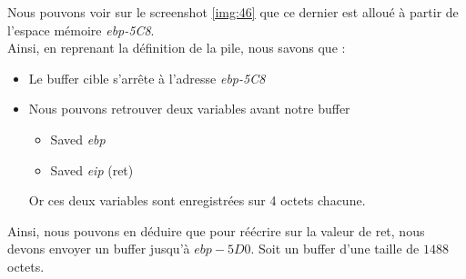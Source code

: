 Nous pouvons voir sur le screenshot \ref{img:46} que ce dernier est alloué à partir de l'espace mémoire \textit{ebp-5C8}.\\
Ainsi, en reprenant la définition de la pile, nous savons que :
\begin{itemize}
 \item Le buffer cible s'arrête à l'adresse \textit{ebp-5C8}
 \item Nous pouvons retrouver deux variables avant notre buffer
 \begin{itemize}
  \item Saved \textit{ebp}
  \item Saved \textit{eip} (ret)
 \end{itemize}
  Or ces deux variables sont enregistrées sur 4 octets chacune.
\end{itemize}
Ainsi, nous pouvons en déduire que pour réécrire sur la valeur de ret, nous devons envoyer un buffer jusqu'à $ebp-5D0$. Soit un buffer d'une taille de $1488$ octets.